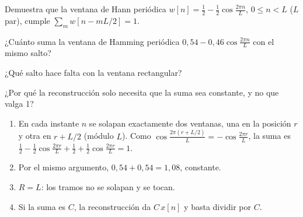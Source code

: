 \documentclass[11pt,a4paper]{scrartcl}
\begin{document}
\begin{ejercicio}
  \begin{incisos}[1]
    \item Demuestra que la ventana de Hann periódica $w[n]=\frac12-\frac12\cos\frac{2\pi n}L$, $0\le n<L$ ($L$ par), cumple $\sum_mw[n-mL/2]=1$.
    \item ¿Cuánto suma la ventana de Hamming periódica $0{,}54-0{,}46\cos\frac{2\pi n}L$ con el mismo salto?
    \item ¿Qué salto hace falta con la ventana rectangular?
    \item ¿Por qué la reconstrucción solo necesita que la suma sea constante, y no que valga 1?
  \end{incisos}
\end{ejercicio}
\begin{solucion}
  \begin{enumerate}[label=\alph*)]
    \item En cada instante $n$ se solapan exactamente dos ventanas, una en la posición $r$ y otra en $r+L/2$ (módulo $L$). Como $\cos\frac{2\pi(r+L/2)}L=-\cos\frac{2\pi r}L$, la suma es $\frac12-\frac12\cos\frac{2\pi r}L+\frac12+\frac12\cos\frac{2\pi r}L=1$.
    \item Por el mismo argumento, $0{,}54+0{,}54=1{,}08$, constante.
    \item $R=L$: los tramos no se solapan y se tocan.
    \item Si la suma es $C$, la reconstrucción da $C\,x[n]$ y basta dividir por $C$.
  \end{enumerate}
\end{solucion}
\end{document}
